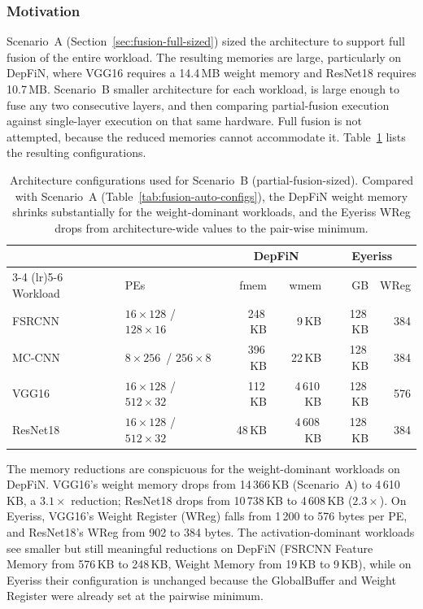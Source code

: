 \subsubsection{Motivation}

Scenario~A (Section~\ref{sec:fusion-full-sized}) sized the
architecture to support full fusion of the entire workload.
The resulting memories are large, particularly on DepFiN, where
VGG16 requires a 14.4\,MB weight memory and ResNet18 requires
10.7\,MB.
Scenario~B smaller architecture for
each workload, is large enough to fuse any two consecutive
layers, and then comparing partial-fusion execution against
single-layer execution on that same hardware.
Full fusion is not attempted, because the reduced memories
cannot accommodate it.
Table~\ref{tab:partial-sized-configs} lists the resulting
configurations.

\begin{table}[htbp]
  \centering
  \caption{Architecture configurations used for Scenario~B
    (partial-fusion-sized).
    Compared with Scenario~A
    (Table~\ref{tab:fusion-auto-configs}), the DepFiN weight
    memory shrinks substantially for the weight-dominant
    workloads, and the Eyeriss WReg drops from architecture-wide
    values to the pair-wise minimum.}
  \label{tab:partial-sized-configs}
  \begin{tabular}{ll rr rr}
    \toprule
    & & \multicolumn{2}{c}{DepFiN} & \multicolumn{2}{c}{Eyeriss} \\
    \cmidrule(lr){3-4} \cmidrule(lr){5-6}
    Workload & PEs
      & fmem & wmem
      & GB & WReg \\
    \midrule
    FSRCNN   & $16 \times 128$ / $128 \times 16$
      & 248\,KB  & 9\,KB
      & 128\,KB  & 384 \\
    MC-CNN   & $8 \times 256$\, / $256 \times 8$
      & 396\,KB  & 22\,KB
      & 128\,KB  & 384 \\
    VGG16    & $16 \times 128$ / $512 \times 32$
      & 112\,KB  & 4\,610\,KB
      & 128\,KB  & 576 \\
    ResNet18 & $16 \times 128$ / $512 \times 32$
      & 48\,KB   & 4\,608\,KB
      & 128\,KB  & 384 \\
    \bottomrule
  \end{tabular}
\end{table}

The memory reductions are conspicuous for the weight-dominant
workloads on DepFiN.
VGG16's weight memory drops from 14\,366\,KB (Scenario~A) to
4\,610\,KB, a $3.1\times$ reduction; ResNet18 drops from
10\,738\,KB to 4\,608\,KB ($2.3\times$).
On Eyeriss, VGG16's Weight Register (WReg) falls from 1\,200 to 576 bytes per PE,
and ResNet18's WReg from 902 to 384 bytes.
The activation-dominant workloads see smaller but still
meaningful reductions on DepFiN (FSRCNN Feature Memory from 576\,KB to
248\,KB, Weight Memory from 19\,KB to 9\,KB), while on Eyeriss their
configuration is unchanged because the GlobalBuffer and Weight Register
were already set at the pairwise minimum.

